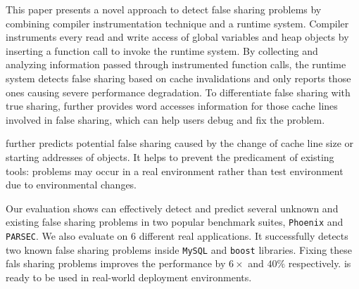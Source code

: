 \label{sec:conclusion}
This paper presents a novel approach to detect false sharing problems by combining
compiler instrumentation technique and a runtime system. 
Compiler instruments every read and write access of global variables
and heap objects by inserting a function call to invoke the runtime
system. 
By collecting and analyzing information passed through instrumented function calls, the runtime system 
detects false sharing based on cache invalidations and only reports those ones  
causing severe performance degradation.
To differentiate false sharing with true sharing, 
\Predator{} further provides word accesses information for those cache lines involved in false sharing, 
which can help users debug and fix the problem.

\Predator{} further predicts potential false sharing caused by the change of cache line size 
or starting addresses of objects. It helps to prevent the predicament of existing tools:
problems may occur in a real environment rather than test environment due to environmental changes.

Our evaluation shows \Predator{} can effectively detect and predict several 
unknown and existing false sharing problems 
in two popular benchmark suites, \texttt{Phoenix} and \texttt{PARSEC}. 
We also evaluate \Predator{} on $6$ different real applications. 
It successfully detects two known false sharing problems inside 
\texttt{MySQL} and \texttt{boost} libraries.
Fixing these fals sharing problems improves the performance by $6\times$ and
$40\%$ respectively.
\Predator{} is ready to be used in real-world deployment environments. 
